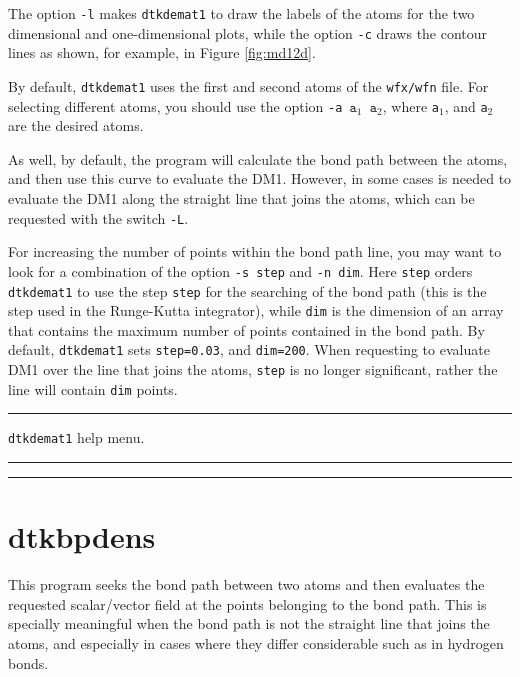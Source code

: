 The option \texttt{-l} makes \texttt{dtkdemat1} to draw the labels of the atoms for the two dimensional and one-dimensional plots, while the option \texttt{-c} draws the contour lines as shown, for example, in Figure \ref{fig:md12d}.

By default, \texttt{dtkdemat1} uses the first and second atoms of the \texttt{wfx/wfn} file. For selecting different atoms, you should use the option \texttt{-a $\mathtt{a}_1$ $\mathtt{a}_2$}, where \texttt{a}$_1$, and \texttt{a}$_2$ are the desired atoms.

As well, by default, the program will calculate the bond path between the atoms, and then use this curve to evaluate the DM1. However, in some cases is needed to evaluate the DM1 along the straight line that joins the atoms, which can be requested with the switch \texttt{-L}.

For increasing the number of points within the bond path line, you may want to look for a combination of the option \texttt{-s step} and \texttt{-n dim}. Here \texttt{step} orders \texttt{dtkdemat1} to use the step \texttt{step} for the searching of the bond path (this is the step used in the Runge-Kutta integrator), while \texttt{dim} is the dimension of an array that contains the maximum number of points contained in the bond path. By default, \texttt{dtkdemat1} sets \texttt{step=0.03}, and \texttt{dim=200}. When requesting to evaluate DM1 over the line that joins the atoms, \texttt{step} is no longer significant, rather the line will contain \texttt{dim} points. 


\rule{\textwidth}{1pt}
{\center\texttt{dtkdemat1} help menu.\\}
\rule{\textwidth}{1pt}
\begin{footnotesize}
\end{footnotesize}
\rule{\textwidth}{1pt}

\section{dtkbpdens}

This program seeks the bond path between two atoms and then evaluates the requested scalar/vector field at the points belonging to the bond path. This is specially meaningful when the bond path is not the straight line that joins the atoms, and especially in cases where they differ considerable such as in hydrogen bonds.

